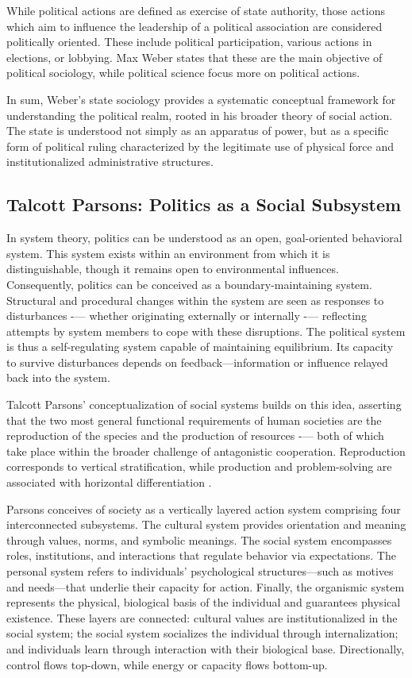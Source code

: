 \documentclass[12pt]{article}
\begin{document}
While political actions are defined as exercise of state authority, those actions which aim to influence the leadership of a political association are considered politically oriented. These include political participation, various actions in elections, or lobbying. Max Weber states that these are the main objective of political sociology, while political science focus more on political actions.

In sum, Weber’s state sociology provides a systematic conceptual framework for understanding the political realm, rooted in his broader theory of social action. The state is understood not simply as an apparatus of power, but as a specific form of political ruling characterized by the legitimate use of physical force and institutionalized administrative structures.



\subsection*{Talcott Parsons: Politics as a Social Subsystem}

In system theory, politics can be understood as an open, goal-oriented behavioral system. This system exists within an environment from which it is distinguishable, though it remains open to environmental influences. Consequently, politics can be conceived as a boundary-maintaining system. Structural and procedural changes within the system are seen as responses to disturbances -— whether originating externally or internally -— reflecting attempts by system members to cope with these disruptions. The political system is thus a self-regulating system capable of maintaining equilibrium. Its capacity to survive disturbances depends on feedback—information or influence relayed back into the system.

Talcott Parsons' conceptualization of social systems builds on this idea, asserting that the two most general functional requirements of human societies are the reproduction of the species and the production of resources -— both of which take place within the broader challenge of antagonistic cooperation. Reproduction corresponds to vertical stratification, while production and problem-solving are associated with horizontal differentiation \citep{parsons1937}.

Parsons conceives of society as a vertically layered action system comprising four interconnected subsystems. The cultural system provides orientation and meaning through values, norms, and symbolic meanings. The social system encompasses roles, institutions, and interactions that regulate behavior via expectations. The personal system refers to individuals’ psychological structures—such as motives and needs—that underlie their capacity for action. Finally, the organismic system represents the physical, biological basis of the individual and guarantees physical existence. These layers are connected: cultural values are institutionalized in the social system; the social system socializes the individual through internalization; and individuals learn through interaction with their biological base. Directionally, control flows top-down, while energy or capacity flows bottom-up.
\end{document}
